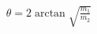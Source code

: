 \documentclass[preview]{standalone}
\begin{document}
\begin{align*}
\theta = 2\arctan\sqrt{\frac{m_1}{m_2}}
\end{align*}
\end{document}
